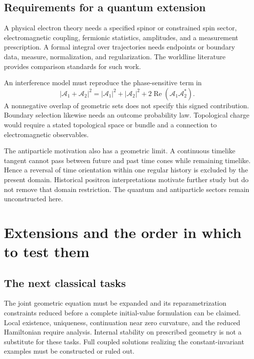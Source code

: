 \documentclass[11pt]{article}
\begin{document}
\subsection{Requirements for a quantum extension}
A physical electron theory needs a specified spinor or constrained spin sector, electromagnetic coupling, fermionic statistics, amplitudes, and a measurement prescription. A formal integral over trajectories needs endpoints or boundary data, measure, normalization, and regularization. The worldline literature provides comparison standards for such work.\cite{strassler,schubert}

An interference model must reproduce the phase-sensitive term in
\begin{equation}
|\mathcal A_1+\mathcal A_2|^2=|\mathcal A_1|^2+|\mathcal A_2|^2+
2\operatorname{Re}(\mathcal A_1\mathcal A_2^*).
\end{equation}
A nonnegative overlap of geometric sets does not specify this signed contribution. Boundary selection likewise needs an outcome probability law. Topological charge would require a stated topological space or bundle and a connection to electromagnetic observables.

The antiparticle motivation also has a geometric limit. A continuous timelike tangent cannot pass between future and past time cones while remaining timelike. Hence a reversal of time orientation within one regular history is excluded by the present domain. Historical positron interpretations\cite{feynman} motivate further study but do not remove that domain restriction. The quantum and antiparticle sectors remain unconstructed here.

\section{Extensions and the order in which to test them}
\subsection{The next classical tasks}
The joint geometric equation must be expanded and its reparametrization constraints reduced before a complete initial-value formulation can be claimed. Local existence, uniqueness, continuation near zero curvature, and the reduced Hamiltonian require analysis. Internal stability on prescribed geometry is not a substitute for these tasks. Full coupled solutions realizing the constant-invariant examples must be constructed or ruled out.
\end{document}
